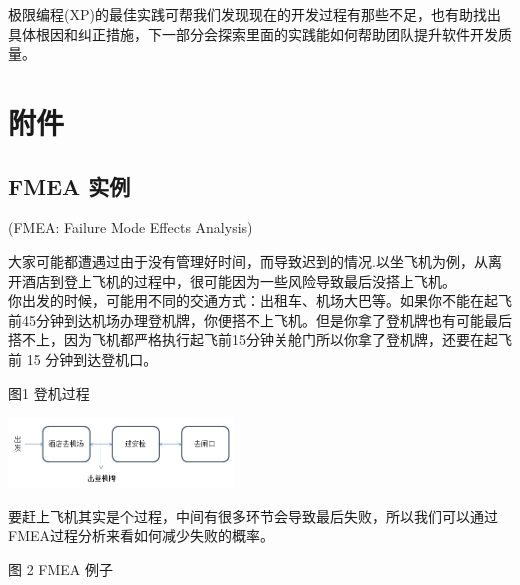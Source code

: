 
极限编程(XP)的最佳实践可帮我们发现现在的开发过程有那些不足，也有助找出具体根因和纠正措施，下一部分会探索里面的实践能如何帮助团队提升软件开发质量。


\hypertarget{ux9644ux4ef6}{%
\section{附件}\label{ux9644ux4ef6}}

\hypertarget{fmea-ux5b9eux4f8b}{%
\subsection{FMEA 实例}\label{fmea-ux5b9eux4f8b}}

\begin{description}
\tightlist
\item[]
(FMEA: Failure Mode Effects Analysis)
\end{description}

大家可能都遭遇过由于没有管理好时间，而导致迟到的情况.以坐飞机为例，从离开酒店到登上飞机的过程中，很可能因为一些风险导致最后没搭上飞机。\\
你出发的时候，可能用不同的交通方式：出租车、机场大巴等。如果你不能在起飞前45分钟到达机场办理登机牌，你便搭不上飞机。但是你拿了登机牌也有可能最后搭不上，因为飞机都严格执行起飞前15分钟关舱门所以你拿了登机牌，还要在起飞前
15 分钟到达登机口。

	
图1 登机过程


\includegraphics[width=6cm]{风险与机会1.png}


要赶上飞机其实是个过程，中间有很多环节会导致最后失败，所以我们可以通过FMEA过程分析来看如何减少失败的概率。

	
图 2 FMEA 例子


